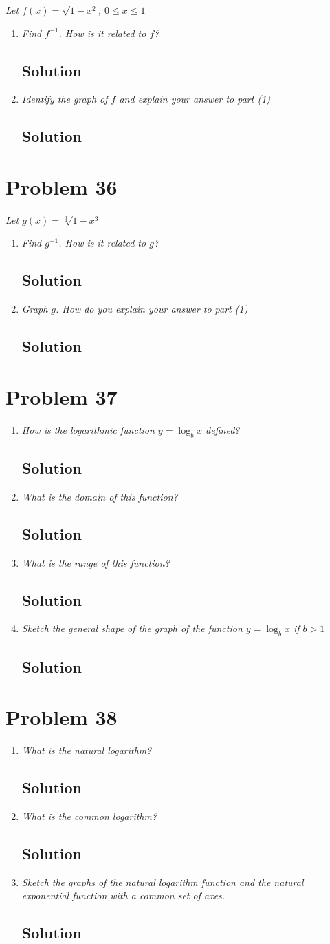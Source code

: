 \documentclass[11pt]{article}
\newcommand{\soln}{\subsection*}
\newcommand{\qn}{\textit}
\begin{document}
\qn{Let $f(x)=\sqrt{1-x^2}$, $0 \le x \le 1$}

\begin{enumerate}
	\item \qn{Find $f^{-1}$. How is it related to $f$?}
	\soln{Solution}
	
	\item \qn{Identify the graph of $f$ and explain your answer to part (1)}
	\soln{Solution}
\end{enumerate}

\section*{Problem 36}

\qn{Let $g(x)=\sqrt[3]{1-x^3}$}

\begin{enumerate}
	\item \qn{Find $g^{-1}$. How is it related to $g$?}
	\soln{Solution}
	
	\item \qn{Graph $g$. How do you explain your answer to part (1)}
	\soln{Solution}
\end{enumerate}

\section*{Problem 37}

\begin{enumerate}
	\item \qn{How is the logarithmic function $y=\log_b{x}$ defined?}
	\soln{Solution}
	
	\item \qn{What is the domain of this function?}
	\soln{Solution}
	
	\item \qn{What is the range of this function?}
	\soln{Solution}
	
	\item \qn{Sketch the general shape of the graph of the function $y=\log_b{x}$ if $b>1$}
	\soln{Solution}
\end{enumerate}

\section*{Problem 38}

\begin{enumerate}
	\item \qn{What is the natural logarithm?}
	\soln{Solution}
	
	\item \qn{What is the common logarithm?}
	\soln{Solution}
	
	\item \qn{Sketch the graphs of the natural logarithm function and the natural exponential function with a common set of axes.}
	\soln{Solution}
\end{enumerate}
\end{document}
